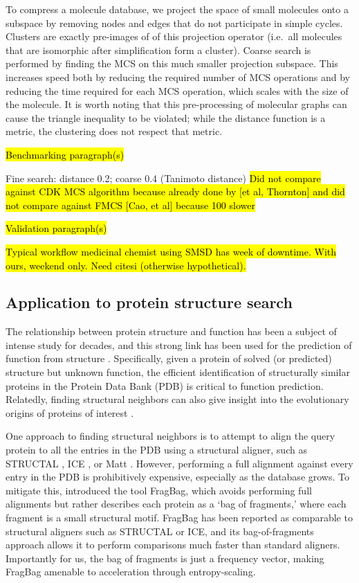 \documentclass[review,preprint,12pt]{elsarticle}
\renewcommand{\cite}{\citep} %
\theoremstyle{definition}
\theoremstyle{remark}
\numberwithin{equation}{section}
\begin{document}
To compress a molecule database, we project the space of small molecules onto a subspace by removing nodes and edges that do not participate in simple cycles.
Clusters are exactly pre-images of of this projection operator (i.e.~all molecules that are isomorphic after simplification form a cluster).
Coarse search is performed by finding the MCS on this much smaller projection subspace. This increases speed both by reducing the required number of MCS operations 
and by reducing the time required for each MCS operation, which scales with the size of the molecule.
It is worth noting that this pre-processing of molecular graphs can cause the 
triangle inequality to be violated; while the distance function is a metric, the
clustering does not respect that metric.

\hl{Benchmarking paragraph(s)}

Fine search: distance 0.2; coarse 0.4 (Tanimoto distance)
\hl{Did not compare against CDK MCS algorithm because already done by [et al, Thornton] and did not compare against FMCS [Cao, et al] because 100 slower}

\hl{Validation paragraph(s)}

\hl{Typical workflow medicinal chemist using SMSD has week of downtime. With ours, weekend only. Need citesi (otherwise hypothetical).}

\subsection{Application to protein structure search}

The relationship between protein structure and function has been a subject of intense study for decades,
and this strong link has been used for the prediction of function from structure \cite{hegyi1999relationship}.
Specifically, given a protein of solved (or predicted) structure but unknown function, the efficient identification
of structurally similar proteins in the Protein Data Bank (PDB) is critical to function prediction.
Relatedly, finding structural neighbors can also give insight into the evolutionary origins of proteins of interest \cite{yona1999protomap,nepomnyachiy2014global}.

One approach to finding structural neighbors is to attempt to align the query protein to all the entries in the PDB using a structural aligner, such as 
STRUCTAL \cite{subbiah1993structural}, ICE \cite{shindyalov1998protein}, or 
Matt \cite{menke2008matt}.
However, performing a full alignment against every entry in the PDB is prohibitively expensive, especially as the database grows.
To mitigate this, \citep{budowski2010fragbag} introduced the tool FragBag, which avoids performing full alignments but rather describes each protein as a
`bag of fragments,' where each fragment is a small structural motif.
FragBag has been reported as comparable to structural aligners such as STRUCTAL or ICE,
and its bag-of-fragments approach
allows it to perform comparisons much faster than standard aligners.
Importantly for us, the bag of fragments is just a frequency vector, making
FragBag amenable to acceleration through entropy-scaling.
\end{document}

